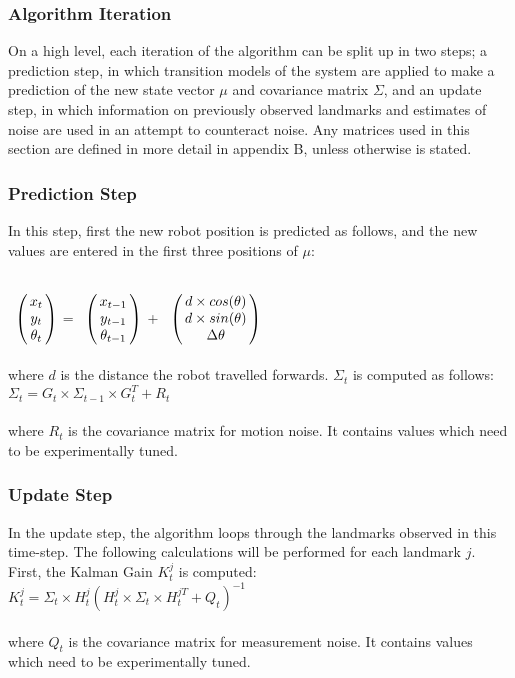\documentclass{ba-kecs}
\numberwithin{figure}{section}
\numberwithin{equation}{section}
\begin{document}
{\subsubsection{Algorithm Iteration}
On a high level, each iteration of the algorithm can be split up in two steps; a prediction step, in which transition models of the system are applied to make a prediction of the new state vector $\mu$ and covariance matrix $\Sigma$, and an update step, in which information on previously observed landmarks and estimates of noise are used in an attempt to counteract noise. Any matrices used in this section are defined in more detail in appendix B, unless otherwise is stated.

\subsubsection{Prediction Step}
In this step, first the new robot position is predicted as follows, and the new values are entered in the first three positions of $\mu$:

$\bordermatrix{         & \cr
                 &x_{t} \cr
                 &y_{t} \cr
                 &\theta_{t} \cr}$
=
$\bordermatrix{         & \cr
                 &x_{t-1} \cr
                 &y_{t-1} \cr
                 &\theta_{t-1} \cr}$
+
$\bordermatrix{         & \cr
                 &d \times cos(\theta) \cr
                 &d \times sin(\theta) \cr
                 &\Delta\theta \cr}$ \\ \\
where $d$ is the distance the robot travelled forwards. $\Sigma_t$ is computed as follows: \\

$\Sigma_t = G_t \times \Sigma_{t-1} \times G_t^T + R_t$ \\ \\
where $R_t$ is the covariance matrix for motion noise. It contains values which need to be experimentally tuned.

\subsubsection{Update Step}
In the update step, the algorithm loops through the landmarks observed in this time-step. The following calculations will be performed for each landmark $j$. First, the Kalman Gain $K_t^j$ is computed: \\

$K_t^j = \Sigma_t \times H_t^j (H_t^j \times \Sigma_t \times H_t^{jT} + Q_t)^{-1}$ \\ \\
where $Q_t$ is the covariance matrix for measurement noise. It contains values which need to be experimentally tuned. 

}
\end{document}
